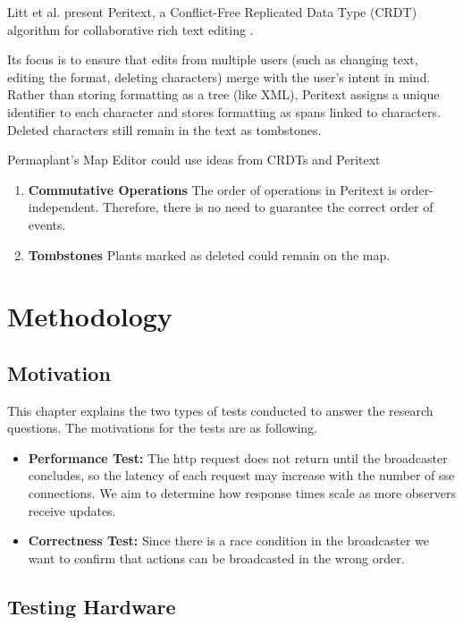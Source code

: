 \documentclass[final,oneside]{vutinfth}
\begin{document}
Litt et al. present Peritext, a Conflict-Free Replicated Data Type (CRDT) algorithm for collaborative rich text editing \cite{peritext}.

Its focus is to ensure that edits from multiple users (such as changing text, editing the format, deleting characters) merge with the user's intent in mind.
Rather than storing formatting as a tree (like XML), Peritext assigns a unique identifier to each character and stores formatting as spans linked to characters.
Deleted characters still remain in the text as tombstones.

Permaplant's Map Editor could use ideas from CRDTs and Peritext
\begin{enumerate}
    \item \textbf{Commutative Operations} The order of operations in Peritext is order-independent.
    Therefore, there is no need to guarantee the correct order of events.
    \item \textbf{Tombstones} Plants marked as deleted could remain on the map.
\end{enumerate}

\chapter{Methodology}

\section{Motivation}

This chapter explains the two types of tests conducted to answer the research questions.
The motivations for the tests are as following.

\begin{itemize}
    \item \textbf{Performance Test:} The \gls{http} request does not return until the broadcaster concludes, so the latency of each request may increase with the number of \gls{sse} connections.
    We aim to determine how response times scale as more observers receive updates.
    \item \textbf{Correctness Test:} Since there is a race condition in the broadcaster we want to confirm that actions can be broadcasted in the wrong order. 
\end{itemize}

\section{Testing Hardware}
\end{document}
